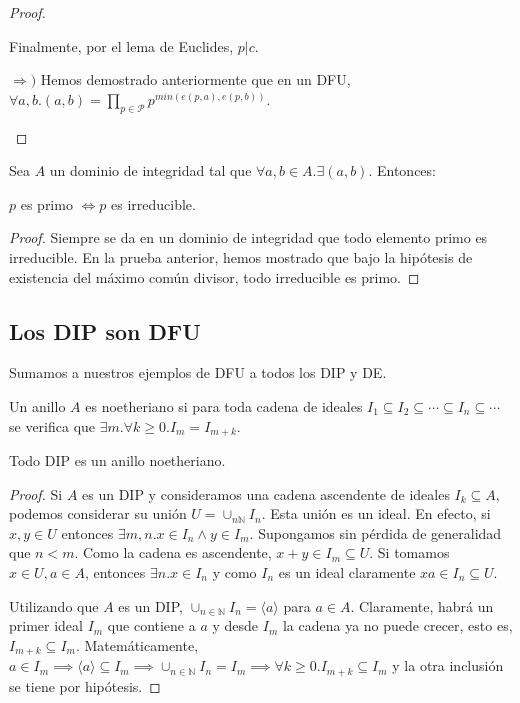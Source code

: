 \begin{proof}
\begin{itemize}
\begin{itemize}
Finalmente, por el lema de Euclides, $p|c$. 
\end{itemize}

$\Rightarrow)$ Hemos demostrado anteriormente que en un DFU, $\forall a,b. (a,b) = \prod_{p \in \mathcal{P}} p^{min(e(p,a),e(p,b))}$. 

\end{itemize}
\end{proof}

\begin{corollary}
Sea $A$ un dominio de integridad tal que $\forall a,b \in A. \exists (a,b)$. Entonces:

$p$ es primo $\iff p$ es irreducible.
\end{corollary}
\begin{proof}
Siempre se da en un dominio de integridad que todo elemento primo es irreducible. En la prueba anterior, hemos mostrado que bajo la hipótesis de existencia del máximo común divisor, todo irreducible es primo.
\end{proof}

\subsection{Los DIP son DFU}

Sumamos a nuestros ejemplos de DFU a todos los DIP y DE. 

\begin{definition}
Un anillo $A$ es noetheriano si para toda cadena de ideales $I_1 \subseteq I_2 \subseteq \cdots \subseteq I_n \subseteq \cdots$ se verifica que $\exists m. \forall k \ge 0. I_m = I_{m+k}$. 
\end{definition}

\begin{lemma}
Todo DIP es un anillo noetheriano.
\end{lemma}
\begin{proof}
Si $A$ es un DIP y consideramos una cadena ascendente de ideales $I_k \subseteq A$, podemos considerar su unión $U = \cup_{n \mathbb{N}} I_n$. Esta unión es un ideal. En efecto, si $x,y \in U$ entonces $\exists m,n. x \in I_n \land y \in I_m$. Supongamos sin pérdida de generalidad que $n < m$. Como la cadena es ascendente, $x+y \in I_m \subseteq U$. Si tomamos $x \in U, a \in A$, entonces $\exists n. x \in I_n$ y como $I_n$ es un ideal claramente $xa \in I_n \subseteq U$. 

Utilizando que $A$ es un DIP, $\cup_{n \in \mathbb{N}} I_n = \langle a \rangle$ para $a \in A$. Claramente, habrá un primer ideal $I_m$ que contiene a $a$ y desde $I_m$ la cadena ya no puede crecer, esto es, $I_{m+k} \subseteq I_m$. Matemáticamente, $a \in I_m \implies \langle a \rangle \subseteq I_m \implies \cup_{n \in \mathbb{N}} I_n = I_m \implies \forall k \ge 0. I_{m+k} \subseteq I_m$ y la otra inclusión se tiene por hipótesis. 
\end{proof}

